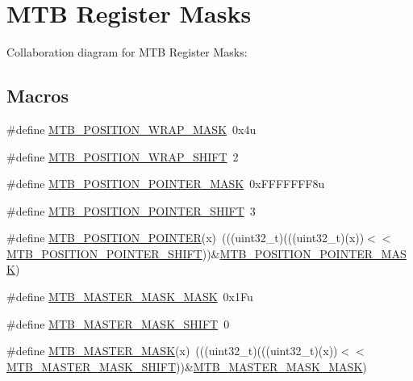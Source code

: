 \hypertarget{group___m_t_b___register___masks}{}\section{M\+TB Register Masks}
\label{group___m_t_b___register___masks}
Collaboration diagram for M\+TB Register Masks\+:
\subsection*{Macros}
\begin{DoxyCompactItemize}
\item 
\#define \hyperlink{group___m_t_b___register___masks_ga78e2e577559e338f1c3b58cc1cc63805}{M\+T\+B\+\_\+\+P\+O\+S\+I\+T\+I\+O\+N\+\_\+\+W\+R\+A\+P\+\_\+\+M\+A\+SK}~0x4u
\item 
\#define \hyperlink{group___m_t_b___register___masks_gab3f7a88c57218b9c54796e7d2f41ac2f}{M\+T\+B\+\_\+\+P\+O\+S\+I\+T\+I\+O\+N\+\_\+\+W\+R\+A\+P\+\_\+\+S\+H\+I\+FT}~2
\item 
\#define \hyperlink{group___m_t_b___register___masks_gadb8fe67da29e5443d81624d913c6a5da}{M\+T\+B\+\_\+\+P\+O\+S\+I\+T\+I\+O\+N\+\_\+\+P\+O\+I\+N\+T\+E\+R\+\_\+\+M\+A\+SK}~0x\+F\+F\+F\+F\+F\+F\+F8u
\item 
\#define \hyperlink{group___m_t_b___register___masks_ga7857f68d5a75794dbf744b3c484f782f}{M\+T\+B\+\_\+\+P\+O\+S\+I\+T\+I\+O\+N\+\_\+\+P\+O\+I\+N\+T\+E\+R\+\_\+\+S\+H\+I\+FT}~3
\item 
\#define \hyperlink{group___m_t_b___register___masks_ga6521f4d89fa83ad4b901b931b36b2415}{M\+T\+B\+\_\+\+P\+O\+S\+I\+T\+I\+O\+N\+\_\+\+P\+O\+I\+N\+T\+ER}(x)~(((uint32\+\_\+t)(((uint32\+\_\+t)(x))$<$$<$\hyperlink{group___m_t_b___register___masks_ga7857f68d5a75794dbf744b3c484f782f}{M\+T\+B\+\_\+\+P\+O\+S\+I\+T\+I\+O\+N\+\_\+\+P\+O\+I\+N\+T\+E\+R\+\_\+\+S\+H\+I\+FT}))\&\hyperlink{group___m_t_b___register___masks_gadb8fe67da29e5443d81624d913c6a5da}{M\+T\+B\+\_\+\+P\+O\+S\+I\+T\+I\+O\+N\+\_\+\+P\+O\+I\+N\+T\+E\+R\+\_\+\+M\+A\+SK})
\item 
\#define \hyperlink{group___m_t_b___register___masks_ga718f776541b94b2e942aac9479a60963}{M\+T\+B\+\_\+\+M\+A\+S\+T\+E\+R\+\_\+\+M\+A\+S\+K\+\_\+\+M\+A\+SK}~0x1\+Fu
\item 
\#define \hyperlink{group___m_t_b___register___masks_gad437c892ab8b61d2ffb4cd86dd2aa9b5}{M\+T\+B\+\_\+\+M\+A\+S\+T\+E\+R\+\_\+\+M\+A\+S\+K\+\_\+\+S\+H\+I\+FT}~0
\item 
\#define \hyperlink{group___m_t_b___register___masks_ga58835f546d852779402878c8f30204c5}{M\+T\+B\+\_\+\+M\+A\+S\+T\+E\+R\+\_\+\+M\+A\+SK}(x)~(((uint32\+\_\+t)(((uint32\+\_\+t)(x))$<$$<$\hyperlink{group___m_t_b___register___masks_gad437c892ab8b61d2ffb4cd86dd2aa9b5}{M\+T\+B\+\_\+\+M\+A\+S\+T\+E\+R\+\_\+\+M\+A\+S\+K\+\_\+\+S\+H\+I\+FT}))\&\hyperlink{group___m_t_b___register___masks_ga718f776541b94b2e942aac9479a60963}{M\+T\+B\+\_\+\+M\+A\+S\+T\+E\+R\+\_\+\+M\+A\+S\+K\+\_\+\+M\+A\+SK})

\end{DoxyCompactItemize}
